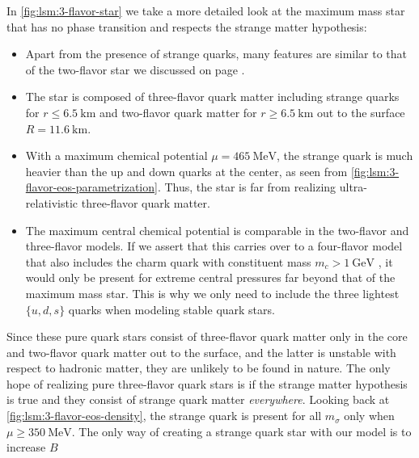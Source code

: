 In \cref{fig:lsm:3-flavor-star} we take a more detailed look at the maximum mass star that has no phase transition and respects the strange matter hypothesis:
\begin{itemize}
\item Apart from the presence of strange quarks, many features are similar to that of the two-flavor star we discussed on page \pageref{list:lsm:2-flavor-star-discussion}.
\item The star is composed of three-flavor quark matter including strange quarks for $r \leq \SI{6.5}{\kilo\meter}$
      and two-flavor quark matter for $r \geq \SI{6.5}{\kilo\meter}$ out to the surface $R=\SI{11.6}{\kilo\meter}$.
\item With a maximum chemical potential $\mu=\SI{465}{\mega\electronvolt}$, the strange quark is much heavier than the up and down quarks at the center, as seen from \cref{fig:lsm:3-flavor-eos-parametrization}.
      Thus, the star is far from realizing ultra-relativistic three-flavor quark matter.
\item The maximum central chemical potential is comparable in the two-flavor and three-flavor models.
      If we assert that this carries over to a four-flavor model that also includes the charm quark with constituent mass $m_c > \SI{1}{\giga\electronvolt}$ \cite{ref:pdg_review_2021},
      it would only be present for extreme central pressures far beyond that of the maximum mass star.
      This is why we only need to include the three lightest $\{u,d,s\}$ quarks when modeling stable quark stars.
\end{itemize}
Since these pure quark stars consist of three-flavor quark matter only in the core
and two-flavor quark matter out to the surface,
and the latter is unstable with respect to hadronic matter,
they are unlikely to be found in nature.
The only hope of realizing pure three-flavor quark stars is
if the strange matter hypothesis is true and they consist of strange quark matter \emph{everywhere}.
Looking back at \cref{fig:lsm:3-flavor-eos-density}, the strange quark is present for all $m_\sigma$ only when $\mu \geq \SI{350}{\mega\electronvolt}$.
The only way of creating a strange quark star with our model is to increase $B$
